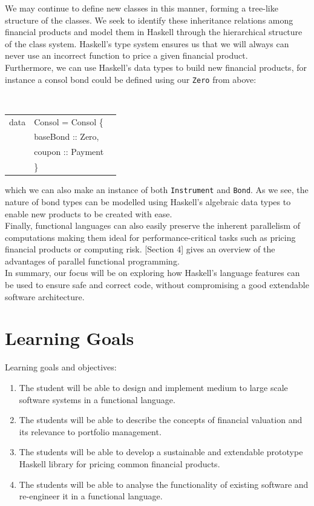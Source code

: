 \documentclass[11pt]{article}
\begin{document}
We may continue to define new classes in this manner, forming a tree-like
structure of the classes. We seek to identify these inheritance relations among
financial products and model them in Haskell through the hierarchical structure
of the class system.
Haskell's type system ensures us that we will always can never use an incorrect
function to price a given financial product.\\

Furthermore, we can use Haskell's data types to build new financial products, for instance
a consol bond could be defined using our {\tt Zero} from above:

\begin{center}
\tt
\begin{tabular}{lll}
data & Consol = Consol \{\\
      &\hspace{-1cm} baseBond :: Zero,\\
      &\hspace{-1cm} coupon   :: Payment\\
      &\hspace{-0.8cm}\}
\end{tabular}
\end{center}

which we can also make an instance of both {\tt Instrument} and {\tt Bond}.
As we see, the nature of bond types can be modelled using Haskell's algebraic
data types to enable new products to be created with ease.\\

Finally, functional languages can also easily preserve the inherent parallelism 
of computations making them ideal for performance-critical tasks such as pricing
financial products or computing risk. \cite{hiperfit2010}[Section 4] gives an
overview of the advantages of parallel functional programming.\\

In summary, our focus will be on exploring how Haskell's language features can be used
to ensure safe and correct code, without compromising a good extendable software architecture.

\section*{Learning Goals}

Learning goals and objectives:

\begin{enumerate}
\item The student will be able to design and implement medium to large scale software systems in a functional language. %
\item The students will be able to describe the concepts of financial valuation and its relevance to portfolio management. %
\item The students will be able to develop a sustainable and extendable prototype Haskell library for pricing common financial products. %
\item The students will be able to analyse the functionality of existing software and re-engineer it in a functional language.
\end{enumerate}
\end{document}
